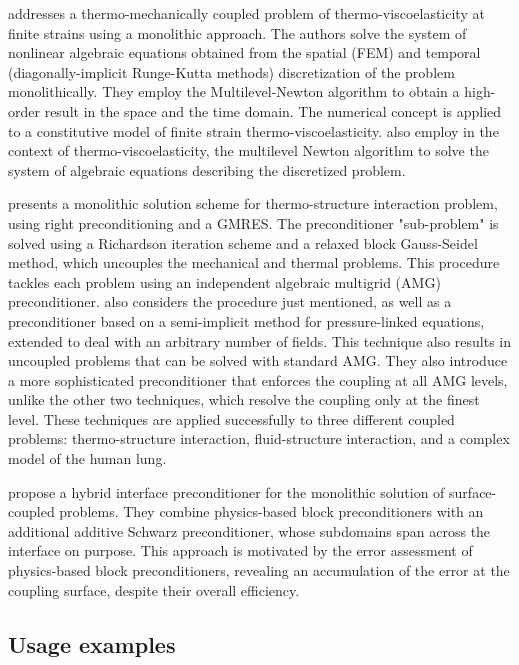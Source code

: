 \cite{netz_high-order_2013} addresses a thermo-mechanically coupled problem of thermo-viscoelasticity at finite strains using a monolithic approach.
The authors solve the system of nonlinear algebraic equations obtained from the spatial (FEM) and temporal (diagonally-implicit Runge-Kutta methods) discretization of the problem monolithically.
They employ the Multilevel-Newton algorithm to obtain a high-order result in the space and the time domain.
The numerical concept is applied to a constitutive model of finite strain thermo-viscoelasticity.
\cite{rothe_monolithic_2015} also employ in the context of thermo-viscoelasticity, the multilevel Newton algorithm to solve the system of algebraic equations describing the discretized problem.

\cite{danowski_monolithic_2013} presents a monolithic solution scheme for thermo-structure interaction problem, using right preconditioning and a GMRES.
The preconditioner "sub-problem" is solved using a Richardson iteration scheme and a relaxed block Gauss-Seidel method, which uncouples the mechanical and thermal problems.
This procedure tackles each problem using an independent algebraic multigrid (AMG) preconditioner.
\cite{verdugo_unified_2016} also considers the procedure just mentioned, as well as a preconditioner based on a semi-implicit method for pressure-linked equations, extended to deal with an arbitrary number of fields.
This technique also results in uncoupled problems that can be solved with standard AMG.
They also introduce a more sophisticated preconditioner that enforces the coupling at all AMG levels, unlike the other two techniques, which resolve the coupling only at the finest level.
These techniques are applied successfully to three different coupled problems: thermo-structure interaction, fluid-structure interaction, and a complex model of the human lung.

\cite{mayr_hybrid_2020} propose a hybrid interface preconditioner for the monolithic solution of surface-coupled problems.
They combine physics-based block preconditioners with an additional additive Schwarz preconditioner, whose subdomains span across the interface on purpose.
This approach is motivated by the error assessment of physics-based block preconditioners, revealing an accumulation of the error at the coupling surface, despite their overall efficiency.

\newpage


\subsection{Usage examples}

